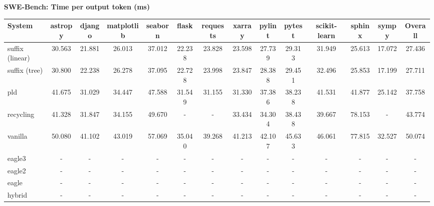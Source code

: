\textbf{SWE-Bench: Time per output token (ms)}
\begin{table}[H]
\begin{adjustbox}{width=\linewidth}
\centering
\begin{tabular}{lccccccccccccc}
\toprule
\textbf{System} & astropy & django & matplotlib & seaborn & flask & requests & xarray & pylint & pytest & scikit-learn & sphinx & sympy & \textbf{Overall} \\
\midrule
suffix (linear) & 30.563 & 21.881 & 26.013 & 37.012 & 22.238 & 23.828 & 23.598 & 27.739 & 29.313 & 31.949 & 25.613 & 17.072 & 27.436 \\
suffix (tree) & 30.800 & 22.238 & 26.278 & 37.095 & 22.728 & 23.998 & 23.847 & 28.388 & 29.451 & 32.496 & 25.853 & 17.199 & 27.711 \\
pld & 41.675 & 31.029 & 34.447 & 47.588 & 31.549 & 31.155 & 31.330 & 37.386 & 38.238 & 41.531 & 41.877 & 25.142 & 37.758 \\
recycling & 41.328 & 31.847 & 34.155 & 49.670 & - & - & 33.434 & 34.304 & 38.438 & 39.667 & 78.153 & - & 43.774 \\
vanilla & 50.080 & 41.102 & 43.019 & 57.069 & 35.040 & 39.268 & 41.213 & 42.107 & 45.633 & 46.061 & 77.815 & 32.527 & 50.074 \\
eagle3 & - & - & - & - & - & - & - & - & - & - & - & - & - \\
eagle2 & - & - & - & - & - & - & - & - & - & - & - & - & - \\
eagle & - & - & - & - & - & - & - & - & - & - & - & - & - \\
hybrid & - & - & - & - & - & - & - & - & - & - & - & - & - \\
\bottomrule
\end{tabular}
\end{adjustbox}
\end{table}

